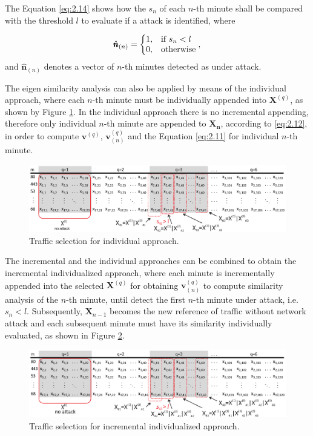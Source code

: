 The Equation \ref{eq:2.14} shows how the $s_n$ of each $n$-th minute shall be compared with the threshold $l$ to evaluate if a attack is identified, where

\begin{equation}\label{eq:2.14}
  \hat{\pmb{n}}_{(n)}=\left\{
  \begin{array}{@{}ll@{}}
    1, & \text{if}\ s_n < l \\
    0, & \text{otherwise}
  \end{array}\right.,
\end{equation}
and $\hat{\pmb{n}}_{(n)}$ denotes a vector of $n$-th minutes detected as under attack.

The eigen similarity analysis can also be applied by means of the individual approach, where each $n$-th minute must be individually appended into $\pmb{X}^{(q)}$, as shown by Figure \ref{fig:2.09}. In the individual approach there is no incremental appending, therefore only individual $n$-th minute are appended to $\pmb{X_n}$, according to \ref{eq:2.12}, in order to compute $\pmb{v}^{(q)}$, $\pmb{v}_{(n)}^{(q)}$ and the Equation \ref{eq:2.11} for individual $n$-th minute.

\begin{figure}[h!]
     \includegraphics[width=15cm]{figures/ch2/individualized.eps}
     \caption{Traffic selection for individual approach.}
     \label{fig:2.09}
\end{figure}

The incremental and the individual approaches can be combined to obtain the incremental individualized approach, where each minute is incrementally appended into the selected $\pmb{X}^{(q)}$ for obtaining $\pmb{v}_{(n)}^{(q)}$ to compute similarity analysis of the $n$-th minute, until detect the first $n$-th minute under attack, i.e. $s_n < l$. Subsequently, $\pmb{X}_{n-1}$ becomes the new reference of traffic without network attack and each subsequent minute must have its similarity individually evaluated, as shown in Figure \ref{fig:2.02}.

\begin{figure}[h!]
     \includegraphics[width=15cm]{figures/ch2/incremental_individualized.eps}
     \caption{Traffic selection for incremental individualized approach.}
     \label{fig:2.02}
\end{figure}

